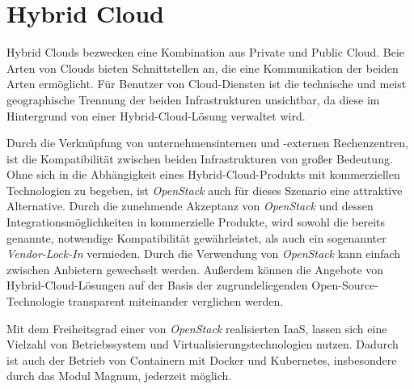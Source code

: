 \documentclass[../main.tex]{subfiles}
\begin{document}

  \section{Hybrid Cloud}
  \label{hybridCloud}
    Hybrid Clouds bezwecken eine Kombination aus Private und Public Cloud. Beie Arten von Clouds bieten Schnittstellen an, die eine Kommunikation der beiden Arten ermöglicht. Für Benutzer von Cloud-Diensten ist die technische und meist geographische Trennung der beiden Infrastrukturen unsichtbar, da diese im Hintergrund von einer Hybrid-Cloud-Lösung verwaltet wird.

    Durch die Verknüpfung von unternehmensinternen und -externen Rechenzentren, ist die Kompatibilität zwischen beiden Infrastrukturen von großer Bedeutung. Ohne sich in die Abhängigkeit eines Hybrid-Cloud-Produkts mit kommerziellen Technologien zu begeben, ist \emph{OpenStack} auch für dieses Szenario eine attraktive Alternative. Durch die zunehmende Akzeptanz von \emph{OpenStack} und dessen Integrationsmöglichkeiten in kommerzielle Produkte, wird sowohl die bereits genannte, notwendige Kompatibilität gewährleistet, als auch ein sogenannter \emph{Vendor-Lock-In} vermieden. Durch die Verwendung von \emph{OpenStack} kann einfach zwischen Anbietern gewechselt werden. Außerdem können die Angebote von Hybrid-Cloud-Lösungen auf der Basis der zugrundeliegenden Open-Source-Technologie transparent miteinander verglichen werden.

    Mit dem Freiheitsgrad einer von \emph{OpenStack} realisierten IaaS, lassen sich eine Vielzahl von Betriebssystem und Virtualisierungstechnologien nutzen. Dadurch ist auch der Betrieb von Containern mit Docker und Kubernetes, insbesondere durch das Modul Magnum, jederzeit möglich.





\end{document}
